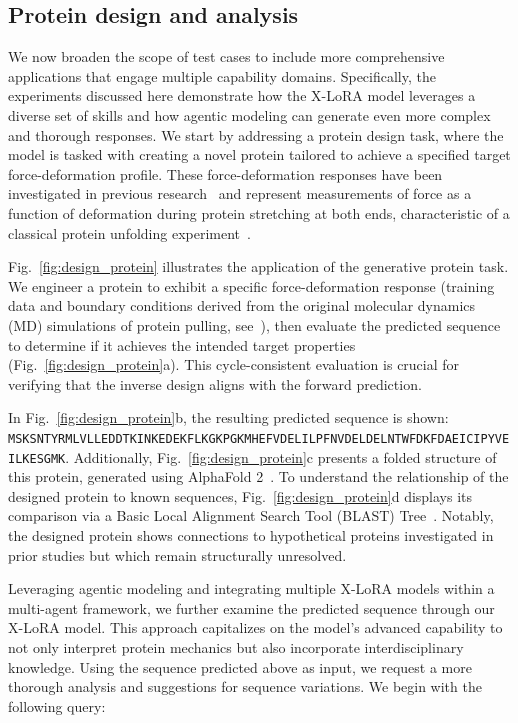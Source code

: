 \subsection{Protein design and analysis}

We now broaden the scope of test cases to include more comprehensive applications that engage multiple capability domains. Specifically, the experiments discussed here demonstrate how the X-LoRA model leverages a diverse set of skills and how agentic modeling can generate even more complex and thorough responses. We start by addressing a protein design task, where the model is tasked with creating a novel protein tailored to achieve a specified target force-deformation profile. These force-deformation responses have been investigated in previous research~\cite{Ni2023ForceGen:Model} and represent measurements of force as a function of deformation during protein stretching at both ends, characteristic of a classical protein unfolding experiment~\cite{Lu1998UnfoldingSimulation.}.

Fig.~\ref{fig:design_protein} illustrates the application of the generative protein task. We engineer a protein to exhibit a specific force-deformation response (training data and boundary conditions derived from the original molecular dynamics (MD) simulations of protein pulling, see~\cite{Ni2023ForceGen:Model}), then evaluate the predicted sequence to determine if it achieves the intended target properties (Fig.~\ref{fig:design_protein}a). This cycle-consistent evaluation is crucial for verifying that the inverse design aligns with the forward prediction.

In Fig.~\ref{fig:design_protein}b, the resulting predicted sequence is shown: \texttt{MSKSNTYRMLVLLEDDTKINKEDEKFLKGKPGKMHEFVDELILPFNVDELDELNTWFDKFDAEICIPYVEILKESGMK}. Additionally, Fig.~\ref{fig:design_protein}c presents a folded structure of this protein, generated using AlphaFold 2~\cite{Jumper2021HighlyAlphaFoldb}. To understand the relationship of the designed protein to known sequences, Fig.~\ref{fig:design_protein}d displays its comparison via a Basic Local Alignment Search Tool (BLAST) Tree~\cite{Altschul1990BasicTool}. Notably, the designed protein shows connections to hypothetical proteins investigated in prior studies but which remain structurally unresolved.

Leveraging agentic modeling and integrating multiple X-LoRA models within a multi-agent framework, we further examine the predicted sequence through our X-LoRA model. This approach capitalizes on the model’s advanced capability to not only interpret protein mechanics but also incorporate interdisciplinary knowledge. Using the sequence predicted above as input, we request a more thorough analysis and suggestions for sequence variations. We begin with the following query:

